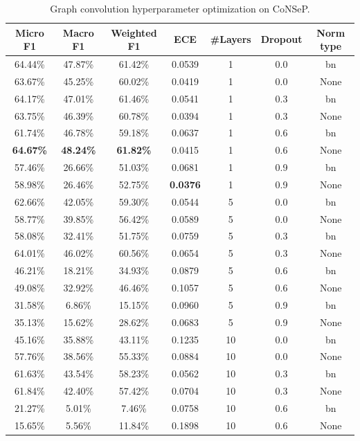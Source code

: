 \begin{table}[ht]
    \centering
    \caption{Graph convolution hyperparameter optimization on CoNSeP.}
\begin{tabular}{|c|c|c|c|c|c|c|}
\hline
Micro F1 & Macro F1 & Weighted F1 & ECE & \#Layers & Dropout & Norm type\\ \hline
64.44\% & 47.87\% & 61.42\% & 0.0539 & 1 & 0.0 & bn\\ \hline
63.67\% & 45.25\% & 60.02\% & 0.0419 & 1 & 0.0 & None\\ \hline
64.17\% & 47.01\% & 61.46\% & 0.0541 & 1 & 0.3 & bn\\ \hline
63.75\% & 46.39\% & 60.78\% & 0.0394 & 1 & 0.3 & None\\ \hline
61.74\% & 46.78\% & 59.18\% & 0.0637 & 1 & 0.6 & bn\\ \hline
\textbf{64.67\%} & \textbf{48.24\%} & \textbf{61.82\%} & 0.0415 & 1 & 0.6 & None\\ \hline
57.46\% & 26.66\% & 51.03\% & 0.0681 & 1 & 0.9 & bn\\ \hline
58.98\% & 26.46\% & 52.75\% & \textbf{0.0376} & 1 & 0.9 & None\\ \hline
62.66\% & 42.05\% & 59.30\% & 0.0544 & 5 & 0.0 & bn\\ \hline
58.77\% & 39.85\% & 56.42\% & 0.0589 & 5 & 0.0 & None\\ \hline
58.08\% & 32.41\% & 51.75\% & 0.0759 & 5 & 0.3 & bn\\ \hline
64.01\% & 46.02\% & 60.56\% & 0.0654 & 5 & 0.3 & None\\ \hline
46.21\% & 18.21\% & 34.93\% & 0.0879 & 5 & 0.6 & bn\\ \hline
49.08\% & 32.92\% & 46.46\% & 0.1057 & 5 & 0.6 & None\\ \hline
31.58\% & 6.86\% & 15.15\% & 0.0960 & 5 & 0.9 & bn\\ \hline
35.13\% & 15.62\% & 28.62\% & 0.0683 & 5 & 0.9 & None\\ \hline
45.16\% & 35.88\% & 43.11\% & 0.1235 & 10 & 0.0 & bn\\ \hline
57.76\% & 38.56\% & 55.33\% & 0.0884 & 10 & 0.0 & None\\ \hline
61.63\% & 43.54\% & 58.23\% & 0.0562 & 10 & 0.3 & bn\\ \hline
61.84\% & 42.40\% & 57.42\% & 0.0704 & 10 & 0.3 & None\\ \hline
21.27\% & 5.01\% & 7.46\% & 0.0758 & 10 & 0.6 & bn\\ \hline
15.65\% & 5.56\% & 11.84\% & 0.1898 & 10 & 0.6 & None\\ \hline

\end{tabular}
\end{table}
